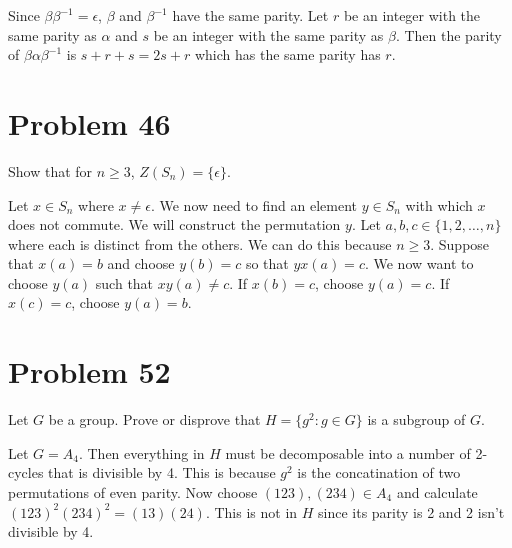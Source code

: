 \documentclass{article}
\begin{document}
Since $\beta\beta^{-1}=\epsilon$, $\beta$ and $\beta^{-1}$ have the same parity.
Let $r$ be an integer with the same parity as $\alpha$ and $s$ be an integer
with the same parity as $\beta$.  Then the parity of $\beta\alpha\beta^{-1}$
is $s+r+s = 2s+r$ which has the same parity has $r$.

\section*{Problem 46}

Show that for $n\geq 3$, $Z(S_n)=\{\epsilon\}$.

Let $x\in S_n$ where $x\neq\epsilon$.  We now need to find an element $y\in S_n$
with which $x$ does not commute.  We will construct the permutation $y$.
Let $a,b,c\in\{1,2,\dots,n\}$ where each is
distinct from the others.  We can do this because $n\geq 3$.  Suppose that $x(a)=b$
and choose $y(b)=c$ so that $yx(a)=c$.  We now want to choose $y(a)$ such that
$xy(a)\neq c$.  If $x(b)=c$, choose $y(a)=c$.  If $x(c)=c$, choose $y(a)=b$.

\section*{Problem 52}

Let $G$ be a group.  Prove or disprove that $H=\{g^2:g\in G\}$ is a subgroup
of $G$.

Let $G=A_4$.  Then everything in $H$ must be decomposable into a number of
2-cycles that is divisible by 4.  This is because $g^2$ is the concatination
of two permutations of even parity.
Now choose $(123),(234)\in A_4$ and calculate
$(123)^2(234)^2 = (13)(24)$.  This is not in $H$ since its parity is 2 and 2
isn't divisible by 4.
\end{document}
